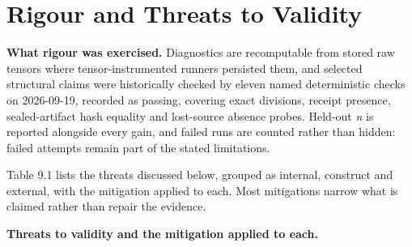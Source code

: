 \documentclass[12pt,a4paper]{report}
\begin{document}
\section{Rigour and Threats to
Validity}\label{rigour-and-threats-to-validity}

\textbf{What rigour was exercised.} Diagnostics are recomputable from
stored raw tensors where tensor-instrumented runners persisted them, and
selected structural claims were historically checked by eleven named
deterministic checks on 2026-09-19, recorded as passing, covering exact
divisions, receipt presence, sealed-artifact hash equality and
lost-source absence probes. Held-out \emph{n} is reported alongside
every gain, and failed runs are counted rather than hidden: failed
attempts remain part of the stated limitations.

Table 9.1 lists the threats discussed below, grouped as internal,
construct and external, with the mitigation applied to each. Most
mitigations narrow what is claimed rather than repair the evidence.

\textbf{Threats to validity and the mitigation applied to each.}
\end{document}
